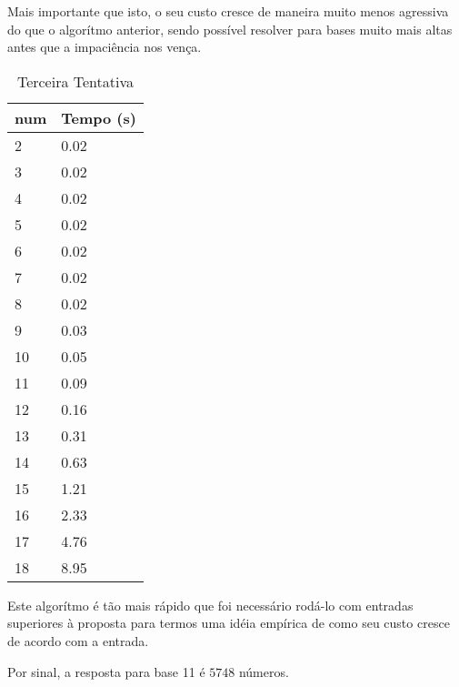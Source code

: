 \documentclass[12pt]{article}
\begin{document}
Mais importante que isto, o seu custo cresce de maneira muito menos agressiva do que o algorítmo anterior, sendo possível resolver para bases muito mais altas antes que a impaciência nos vença.

\begin{table}[h]
\caption{Terceira Tentativa}
\label{table:resultados-3}
\begin{tabular}{ll}
  {\sf num} & Tempo (s) \\
  \hline
  2 & 0.02 \\
  3 & 0.02 \\
  4 & 0.02 \\
  5 & 0.02 \\
  6 & 0.02 \\
  7 & 0.02 \\
  8 & 0.02 \\
  9 & 0.03 \\
 10 & 0.05 \\
 11 & 0.09 \\
 12 & 0.16 \\
 13 & 0.31 \\
 14 & 0.63 \\
 15 & 1.21 \\
 16 & 2.33 \\
 17 & 4.76 \\
 18 & 8.95
  \end{tabular}
  \end{table}
  
Este algorítmo é tão mais rápido que foi necessário rodá-lo com entradas superiores à proposta para termos uma idéia empírica de como seu custo cresce de acordo com a entrada.

Por sinal, a resposta para base 11 é $5748$ números.
\end{document}

